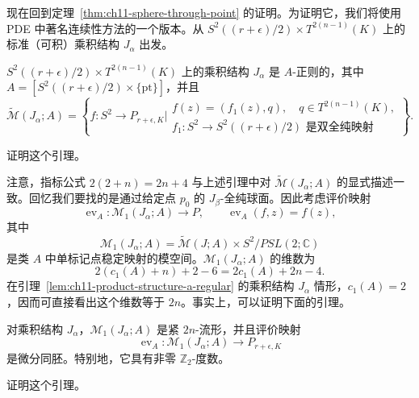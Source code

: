 现在回到定理~\ref{thm:ch11-sphere-through-point} 的证明。为证明它，我们将使用 PDE 中著名连续性方法的一个版本。从
$S^2((r+\epsilon)/2)\times T^{2(n-1)}(K)$ 上的标准（可积）乘积结构 $J_\alpha$ 出发。

\begin{lemma}\label{lem:ch11-product-structure-a-regular}
$S^2((r+\epsilon)/2)\times T^{2(n-1)}(K)$ 上的乘积结构 $J_\alpha$ 是
$A$-正则的，其中
$A=[S^2((r+\epsilon)/2)\times\{\mathrm{pt}\}]$，并且
\[
 \widetilde{\mathcal M}(J_\alpha;A)
 =\left\{f:S^2\to P_{r+\epsilon,K}\mathrel{\Big|}
 \begin{array}{l}
 f(z)=(f_1(z),q),\quad q\in T^{2(n-1)}(K),\\
 f_1:S^2\to S^2((r+\epsilon)/2)\text{ 是双全纯映射}
 \end{array}\right\}.
\]
\end{lemma}

\begin{exercise}\label{ex:ch11-product-structure-regular}
证明这个引理。
\end{exercise}

注意，指标公式 $2(2+n)=2n+4$ 与上述引理中对
$\widetilde{\mathcal M}(J_\alpha;A)$ 的显式描述一致。回忆我们要找的是通过给定点 $p_0$ 的 $J_\beta$-全纯球面。因此考虑评价映射
\[
 \operatorname{ev}_A:\mathcal M_1(J_\alpha;A)\longrightarrow P,
 \qquad \operatorname{ev}_A(f,z)=f(z),
\]
其中
\[
 \mathcal M_1(J_\alpha;A)
 =\widetilde{\mathcal M}(J;A)\times S^2/PSL(2;\mathbb C)
\]
是类 $A$ 中单标记点稳定映射的模空间。$\mathcal M_1(J_\alpha;A)$ 的维数为
\[
 2(c_1(A)+n)+2-6=2c_1(A)+2n-4.
\]
在引理~\ref{lem:ch11-product-structure-a-regular} 的乘积结构 $J_\alpha$ 情形，$c_1(A)=2$，因而可直接看出这个维数等于 $2n$。事实上，可以证明下面的引理。

\begin{lemma}\label{lem:ch11-product-evaluation-diffeomorphism}
对乘积结构 $J_\alpha$，$\mathcal M_1(J_\alpha;A)$ 是紧 $2n$-流形，并且评价映射
\[
 \operatorname{ev}_A:\mathcal M_1(J_\alpha;A)\longrightarrow P_{r+\epsilon,K}
\]
是微分同胚。特别地，它具有非零 $\mathbb Z_2$-度数。
\end{lemma}

\begin{exercise}\label{ex:ch11-product-evaluation-diffeomorphism}
证明这个引理。
\end{exercise}


